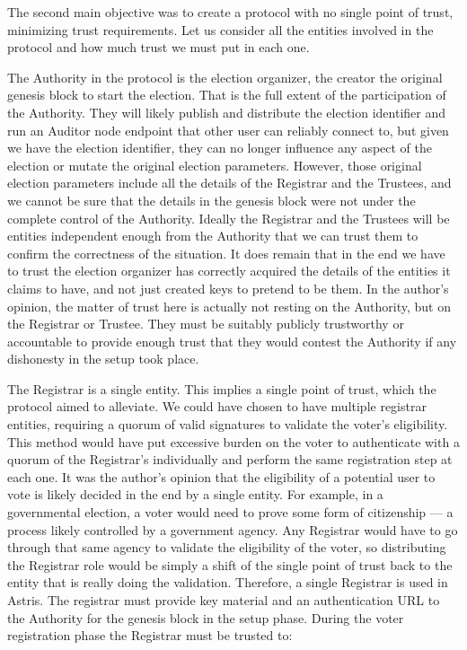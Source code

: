 The second main objective was to create a protocol with no single point of trust, minimizing trust requirements. Let us consider all the entities involved in the protocol and how much trust we must put in each one.

The Authority in the protocol is the election organizer, the creator the original genesis block to start the election. That is the full extent of the participation of the Authority. They will likely publish and distribute the election identifier and run an Auditor node endpoint that other user can reliably connect to, but given we have the election identifier, they can no longer influence any aspect of the election or mutate the original election parameters. However, those original election parameters include all the details of the Registrar and the Trustees, and we cannot be sure that the details in the genesis block were not under the complete control of the Authority. Ideally the Registrar and the Trustees will be entities independent enough from the Authority that we can trust them to confirm the correctness of the situation. It does remain that in the end we have to trust the election organizer has correctly acquired the details of the entities it claims to have, and not just created keys to pretend to be them. In the author's opinion, the matter of trust here is actually not resting on the Authority, but on the Registrar or Trustee. They must be suitably publicly trustworthy or accountable to provide enough trust that they would contest the Authority if any dishonesty in the setup took place.

The Registrar is a single entity. This implies a single point of trust, which the protocol aimed to alleviate. We could have chosen to have multiple registrar entities, requiring a quorum of valid signatures to validate the voter's eligibility. This method would have put excessive burden on the voter to authenticate with a quorum of the Registrar's individually and perform the same registration step at each one. It was the author's opinion that the eligibility of a potential user to vote is likely decided in the end by a single entity. For example, in a governmental election, a voter would need to prove some form of citizenship --- a process likely controlled by a government agency. Any Registrar would have to go through that same agency to validate the eligibility of the voter, so distributing the Registrar role would be simply a shift of the single point of trust back to the entity that is really doing the validation. Therefore, a single Registrar is used in Astris. The registrar must provide key material and an authentication URL to the Authority for the genesis block in the setup phase. During the voter registration phase the Registrar must be trusted to:

